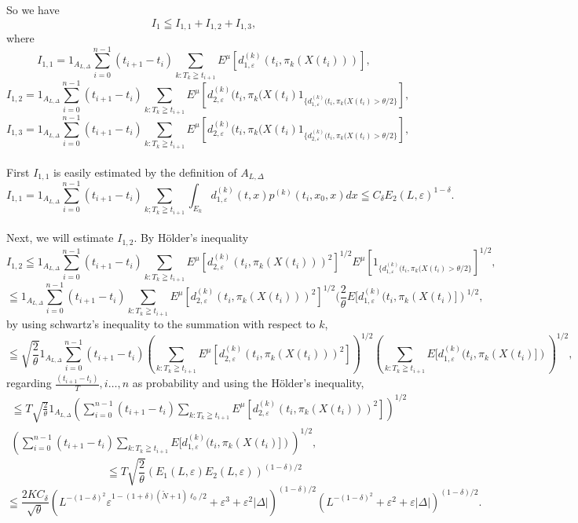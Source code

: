 \documentclass[12pt]{article}
\begin{document}
So we have
$$I_1\leqq I_{1,1}+I_{1,2}+I_{1,3},$$
where
$$
I_{1,1}= 1_{A_{L,\Delta} } \sum_{i=0}^{n-1}(t_{i+1}-t_i) \sum_{k:T_k\geqq t_{i+1} } E ^{\mu}[d_{1,\varepsilon}^{(k)}(t_i, \pi_k (X(t_i))) ],
$$
$$
I_{1,2}= 1_{A_{L,\Delta} } \sum_{i=0}^{n-1}(t_{i+1}-t_i)  \sum_{k:T_k\geqq t_{i+1} } E ^{\mu}[d_{2,\varepsilon}^{(k)}(t_i, \pi_k (X(t_i) 
1_{\{d_{1,\varepsilon}^{(k)}(t_i, \pi_k (X(t_i)  > \theta/2\}}],
$$
$$
I_{1,3}= 1_{A_{L,\Delta} } \sum_{i=0}^{n-1}(t_{i+1}-t_i)  \sum_{k:T_k\geqq t_{i+1} } E ^{\mu}[d_{2,\varepsilon}^{(k)}(t_i, \pi_k (X(t_i) 
1_{\{d_{2,\varepsilon}^{(k)}(t_i, \pi_k (X(t_i)  > \theta/2\}}],
$$
\\
First $I_{1,1}$ is easily estimated by the definition of $A_{L,\Delta}$
$$
I_{1,1}=1_{A_{L,\Delta}} \sum_{i=0}^{n-1} (t_{i+1}-t_i) \sum_{k; T_k \geqq t_{i+1}} \int_{E_k} d_{1,\varepsilon}^{(k)}(t,x) p^{(k)}(t_i, x_0, x)dx 
\leqq C_{\delta}E_2(L, \varepsilon)^{1-\delta}.
$$
\\
Next, we will estimate $I_{1,2}$.  By H\"{o}lder's inequality
$$I_{1,2}\leqq 
1_{A_{L,\Delta} } \sum_{i=0}^{n-1}(t_{i+1}-t_i)  \sum_{k:T_k\geqq t_{i+1} } E ^{\mu}[d_{2,\varepsilon}^{(k)}(t_i, \pi_k (X(t_i)))^2]^{1/2} 
E^{\mu}[1_{\{d_{1,\varepsilon}^{(k)}(t_i, \pi_k (X(t_i)  > \theta/2\}}]^{1/2},$$
$$\leqq 
1_{A_{L,\Delta} } \sum_{i=0}^{n-1}(t_{i+1}-t_i)  \sum_{k:T_k\geqq t_{i+1} } E ^{\mu}[d_{2,\varepsilon}^{(k)}(t_i, \pi_k (X(t_i)))^2]^{1/2} 
(\frac{2}{\theta} E[d_{1,\varepsilon}^{(k)}(t_i, \pi_k (X(t_i) ])^{1/2},$$
by using schwartz's inequality to the summation with respect to $k$,
$$\leqq \sqrt{\frac{2}{\theta}} 1_{A_{L,\Delta} } \sum_{i=0}^{n-1}(t_{i+1}-t_i)   \left(\sum_{k:T_k\geqq t_{i+1} }E ^{\mu}[d_{2,\varepsilon}^{(k)}(t_i, \pi_k (X(t_i)))^2]\right)	^{1/2} 
\left(\sum_{k:T_k\geqq t_{i+1} } E[d_{1,\varepsilon}^{(k)}(t_i, \pi_k (X(t_i) ])\right)^{1/2},$$
regarding $\frac{(t_{i+1}-t_i)}{T}, i\ldots, n$ as probability and using the H\"{o}lder's inequality, 
\begin{multline*}
\leqq T\sqrt{\frac{2}{\theta}} 1_{A_{L,\Delta} }   \left(\sum_{i=0}^{n-1}(t_{i+1}-t_i)  \sum_{k:T_k\geqq t_{i+1} }E ^{\mu}[d_{2,\varepsilon}^{(k)}(t_i, \pi_k (X(t_i)))^2]\right)	^{1/2} \\
\left(\sum_{i=0}^{n-1}(t_{i+1}-t_i)  \sum_{k:T_k\geqq t_{i+1} } E[d_{1,\varepsilon}^{(k)}(t_i, \pi_k (X(t_i) ])\right)^{1/2},
\end{multline*}
$$\leqq T \sqrt{\frac{2}{\theta}} \left(E_1(L, \varepsilon) E_2(L, \varepsilon)\right)^{(1-\delta)/2}$$
$$
\leqq \frac{2KC_{\delta}}{\sqrt{\theta}}  \left(  L^{-(1-\delta)^2}\varepsilon^{1-(1+\delta)(\tilde{N}+1)\ell_0/2} + \varepsilon^3+\varepsilon^2|\Delta| \right)^{(1-\delta)/2}( L^{-(1-\delta)^2}+\varepsilon^2+\varepsilon |\Delta|)^{(1-\delta)/2}. 
$$ 
\end{document}
